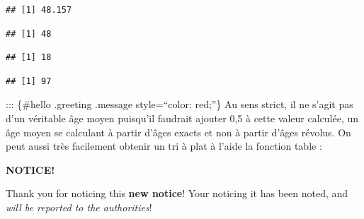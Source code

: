 \documentclass[
]{book}
\newenvironment{Shaded}{\begin{snugshade}}{\end{snugshade}}
\newcommand{\FunctionTok}[1]{\textcolor[rgb]{0.00,0.00,0.00}{#1}}
\newcommand{\NormalTok}[1]{#1}
\newcommand{\SpecialCharTok}[1]{\textcolor[rgb]{0.00,0.00,0.00}{#1}}
\begin{document}
\begin{Shaded}
\end{Shaded}

\begin{verbatim}
## [1] 48.157
\end{verbatim}

\begin{Shaded}
\end{Shaded}

\begin{verbatim}
## [1] 48
\end{verbatim}

\begin{Shaded}
\end{Shaded}

\begin{verbatim}
## [1] 18
\end{verbatim}

\begin{Shaded}
\end{Shaded}

\begin{verbatim}
## [1] 97
\end{verbatim}

::: \{\#hello .greeting .message style=``color: red;''\}
Au sens strict, il ne s'agit pas d'un véritable âge moyen puisqu'il faudrait ajouter 0,5 à cette valeur calculée, un âge moyen se calculant à partir d'âges exacts et non à partir d'âges révolus.
On peut aussi très facilement obtenir un tri à plat à l'aide la fonction table :

\begin{blackbox}

\begin{center}
\textbf{NOTICE!}

\end{center}

Thank you for noticing this \textbf{new notice}! Your noticing it has
been noted, and \emph{will be reported to the authorities}!

\end{blackbox}

  
\end{document}
